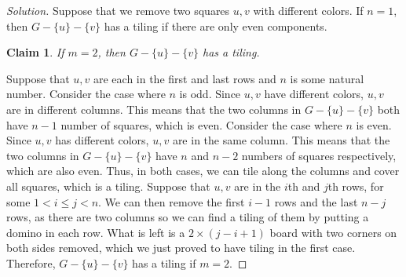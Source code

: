 \documentclass{article}
\newtheorem{claim}[thm]{Claim}
\begin{document}
\begin{enumerate}[label=(\alph*)]
\begin{proof}[Solution]
        Suppose that we remove two squares $u, v$ with different colors. If $n = 1$, then $G - \{u\} - \{v\}$ has a tiling if there are only even components.
        \begin{claim}
            If $m = 2$, then $G - \{u\} - \{v\}$ has a tiling.
        \end{claim}
            Suppose that $u, v$ are each in the first and last rows and $n$ is some natural number. Consider the case where $n$ is odd. Since $u, v$ have different colors, $u, v$ are in different columns. This means that the two columns in $G - \{u\} - \{v\}$ both have $n - 1$ number of squares, which is even. Consider the case where $n$ is even. Since $u, v$ has different colors, $u, v$ are in the same column. This means that the two columns in $G - \{u\} - \{v\}$ have $n$ and $n - 2$ numbers of squares respectively, which are also even. Thus, in both cases, we can tile along the columns and cover all squares, which is a tiling. Suppose that $u, v$ are in the $i$th and $j$th rows, for some $1 < i \leq j < n$. We can then remove the first $i - 1$ rows and the last $n - j$ rows, as there are two columns so we can find a tiling of them by putting a domino in each row. What is left is a $2 \times (j - i + 1)$ board with two corners on both sides removed, which we just proved to have
            tiling in the first case. Therefore, $G - \{u\} - \{v\}$ has a tiling if $m = 2$.
            

\end{proof}
\end{enumerate}
\end{document}
